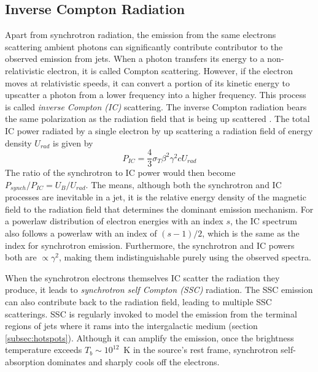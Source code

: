 \subsection{Inverse Compton Radiation\label{subsec:ic}}
Apart from synchrotron radiation, the emission from the same electrons scattering ambient photons can significantly contribute contributor to the observed emission from jets.
When a photon transfers its energy to a non-relativistic electron, it is called Compton scattering. However, if the electron moves at relativistic speeds, it can convert a portion of its kinetic energy to upscatter a photon from a lower frequency into a higher frequency. This process is called \textit{inverse Compton (IC)} scattering. The inverse Compton radiation bears the same polarization as the radiation field that is being up scattered \citep{uchiyama2007infrared}. The total IC power radiated by a single electron by up scattering a radiation field of energy density $U_{rad}$ is given by
\begin{equation}
    P_{IC} =\frac{4}{3}\sigma_T\beta^2\gamma^2cU_{rad}
\end{equation}
The ratio of the synchrotron to IC power would then become $P_{synch}/P_{IC}=U_B/U_{rad}$. The means, although both the synchrotron and IC processes are inevitable in a jet, it is the relative energy density of the magnetic field to the radiation field that determines the dominant emission mechanism. For a powerlaw distribution of electron energies with an index $s$, the IC spectrum also follows a powerlaw with an index of $(s-1)/2$, which is the same as the index for synchrotron emission. Furthermore, the synchrotron and IC powers both are $\propto \gamma^2$, making them indistinguishable purely using the observed spectra.

When the synchrotron electrons themselves IC scatter the radiation they produce, it leads to \textit{synchrotron self Compton (SSC)} radiation. The SSC emission can also contribute back to the radiation field, leading to multiple SSC scatterings. SSC is regularly invoked to model the emission from the terminal regions of jets where it rams into the intergalactic medium (section \ref{subsec:hotspots}). Although it can amplify the emission, once the brightness temperature exceeds $T_b\sim10^{12}$~K \citep[e.g.,][see also \citet{singal2009maximum} in this context]{kellermann1969spectra} in the source's rest frame, synchrotron self-absorption dominates and sharply cools off the electrons.

